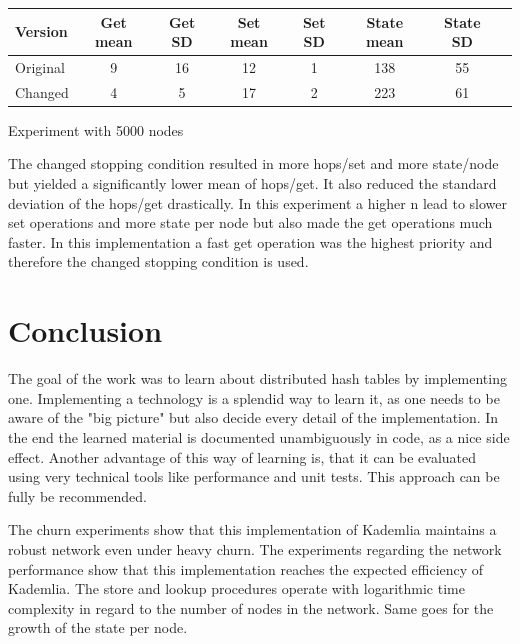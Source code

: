 \documentclass[a4paper, 12pt]{article} %
\begin{document}
\begin{table}[h]
\centering
\begin{tabular}{l*{6}{c}r}
Version           & Get mean & Get SD & Set mean & Set SD & State mean & State SD \\
\hline
Original          & 9        & 16     & 12       & 1      & 138        & 55       \\
Changed           & 4        & 5      & 17       & 2      & 223        & 61       \\
\end{tabular}
  \begin{tablenotes}
    \small
    \item Experiment with 5000 nodes
  \end{tablenotes}
\end{table}

The changed stopping condition resulted in more hops/set and more state/node but yielded a significantly lower mean of hops/get. It also reduced the standard deviation of the hops/get drastically. In this experiment a higher n lead to slower set operations and more state per node but also made the get operations much faster. In this implementation a fast get operation was the highest priority and therefore the changed stopping condition is used.

\newpage
\section{Conclusion}


The goal of the work was to learn about distributed hash tables by implementing one. Implementing a technology is a splendid way to learn it, as one needs to be aware of the "big picture" but also decide every detail of the implementation. In the end the learned material is documented unambiguously in code, as a nice side effect. Another advantage of this way of learning is, that it can be evaluated using very technical tools like performance and unit tests. This approach can be fully be recommended.


The churn experiments show that this implementation of Kademlia maintains a robust network even under heavy churn. The experiments regarding the network performance show that this implementation reaches the expected efficiency of Kademlia. The store and lookup procedures operate with logarithmic time complexity in regard to the number of nodes in the network. Same goes for the growth of the state per node. 
\end{document}
